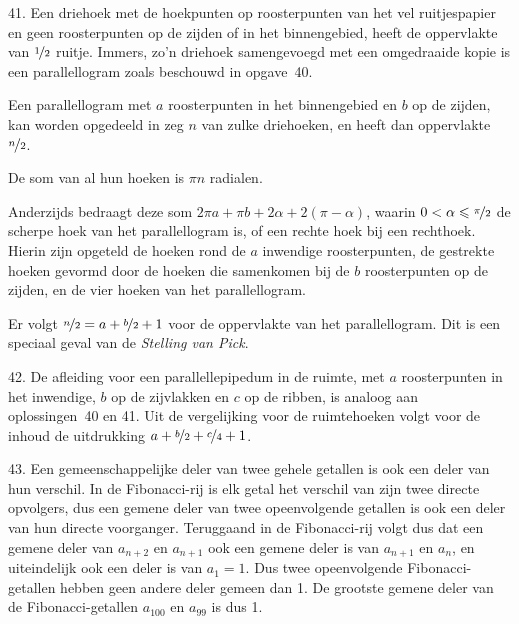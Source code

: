 \begin{problem}{41.}
    Een driehoek met de hoekpunten op roosterpunten van het vel ruitjespapier en geen roosterpunten op de zijden of in het binnengebied, heeft de oppervlakte van $\nicefrac{1}{2}$ ruitje. Immers, zo'n driehoek samen\-gevoegd met een omgedraaide kopie is een parallellogram zoals be\-schouwd in opgave~40.

    Een parallellogram met $a$ roosterpunten in het binnengebied en $b$ op de zijden, kan worden opgedeeld in zeg $n$ van zulke driehoeken, en heeft dan oppervlakte $\nicefrac{n}{2}$.

    De som van al hun hoeken is $\pi n$ radialen.

    Anderzijds bedraagt deze som $2 \pi a + \pi b + 2 \alpha + 2 (\pi - \alpha)$, waarin $0 < \alpha \leq \nicefrac{\pi}{2}$ de scherpe hoek van het parallellogram is, of een rechte hoek bij een rechthoek. Hierin zijn opgeteld de hoeken rond de $a$ inwendige roosterpunten, de gestrekte hoeken gevormd door de hoeken die samenkomen bij de $b$ roosterpunten op de zijden, en de vier hoeken van het parallellogram.

    Er volgt $\nicefrac{n}{2} = a + \nicefrac{b}{2} + 1$ voor de oppervlakte van het parallellogram. Dit is een speciaal geval van de \textit{Stelling van Pick}.
\end{problem}

\begin{problem}{42.}
	De afleiding voor een parallellepipedum in de ruimte, met $a$ roosterpunten in het inwendige, $b$ op de zijvlakken en $c$ op de ribben, is analoog aan oplossingen~40 en 41. Uit de vergelijking voor de ruimte\-hoeken volgt voor de inhoud de uitdrukking $a + \nicefrac{b}{2} + \nicefrac{c}{4} + 1$.
\end{problem}

\clearpage

\begin{problem}{43.}
    Een gemeenschappelijke deler van twee gehele getallen is ook een deler van hun verschil. In de Fibonacci-rij is elk getal het verschil van zijn twee directe opvolgers, dus een gemene deler van twee opeen\-volgende getallen is ook een deler van hun directe voorganger. Terug\-gaand in de Fibonacci-rij volgt dus dat een gemene deler van $a_{n+2}$ en $a_{n+1}$ ook een gemene deler is van $a_{n+1}$ en $a_{n}$, en uiteindelijk ook een deler is van $a_1 = 1$. Dus twee opeenvolgende Fibonacci-getallen hebben geen andere deler gemeen dan 1. De grootste gemene deler van de Fibonacci-getallen $a_{100}$ en $a_{99}$ is dus 1.
\end{problem}

